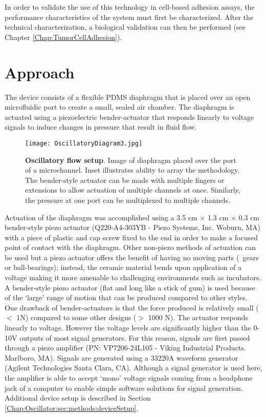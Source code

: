 In order to validate the use of this technology in cell-based adhesion assays, the performance characteristics of the system must first be characterized. After the technical characterization, a biological validation can then be performed (see Chapter \ref{Chap:TumorCellAdhesion}). 

\section{Approach}
The device consists of a flexible PDMS diaphragm that is placed over an open microfluidic port to create a small, sealed air chamber. The diaphragm is actuated using a piezoelectric bender-actuator that responds linearly to voltage signals to induce changes in pressure that result in fluid flow.

\begin{figure}[!ht]
\centering
\texttt{[image: OscillatoryDiagram3.jpg]}
\caption{\textbf{Oscillatory flow setup}. Image of diaphragm placed over the port of a microchannel. Inset illustrates ability to array the methodology. The bender-style actuator can be made with multiple fingers or extensions to allow actuation of multiple channels at once. Similarly, the pressure at one port can be multiplexed to multiple channels.}
\label{Chap:Oscillator:Schematic}
\end{figure}

Actuation of the diaphragm was accomplished using a 3.5 cm $\times$ 1.3 cm $\times$ 0.3 cm bender-style piezo actuator (Q220-A4-303YB - Piezo Systems, Inc. Woburn, MA) with a piece of plastic and cap screw fixed to the end in order to make a focused point of contact with the diaphragm. Other non-piezo methods of actuation can be used but a piezo actuator offers the benefit of having no moving parts (\eg\, gears or ball-bearings); instead, the ceramic material bends upon application of a voltage making it more amenable to challenging environments such as incubators. A bender-style piezo actuator (flat and long like a stick of gum) is used because of the `large' range of motion that can be produced compared to other styles. One drawback of bender-actuators is that the force produced is relatively small ($<$ 1N) compared to some other designs ($>$ 1000 N). The actuator responds linearly to voltage. However the voltage levels are significantly higher than the 0-10V outputs of most signal generators. For this reason, signals are first passed through a piezo amplifier (PN: VP7206-24L105 - Viking Industrial Products. Marlboro, MA). Signals are generated using a 33220A waveform generator (Agilent Technologies Santa Clara, CA). Although a signal generator is used here, the amplifier is able to accept `mono' voltage signals coming from a headphone jack of a computer to enable simple software solutions for signal generation. Additional device setup is described in Section \ref{Chap:Oscillator:sec:methods:deviceSetup}.

